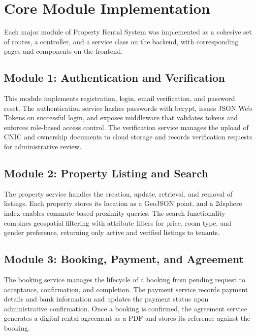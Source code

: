 
\section{Core Module Implementation}

Each major module of Property Rental System was implemented as a cohesive set of routes, a controller, and a service class on the backend, with corresponding pages and components on the frontend.

\subsection{Module 1: Authentication and Verification}

This module implements registration, login, email verification, and password reset. The authentication service hashes passwords with bcrypt, issues JSON Web Tokens on successful login, and exposes middleware that validates tokens and enforces role-based access control. The verification service manages the upload of CNIC and ownership documents to cloud storage and records verification requests for administrative review.

\subsection{Module 2: Property Listing and Search}

The property service handles the creation, update, retrieval, and removal of listings. Each property stores its location as a GeoJSON point, and a 2dsphere index enables commute-based proximity queries. The search functionality combines geospatial filtering with attribute filters for price, room type, and gender preference, returning only active and verified listings to tenants.

\subsection{Module 3: Booking, Payment, and Agreement}

The booking service manages the lifecycle of a booking from pending request to acceptance, confirmation, and completion. The payment service records payment details and bank information and updates the payment status upon administrative confirmation. Once a booking is confirmed, the agreement service generates a digital rental agreement as a PDF and stores its reference against the booking.

